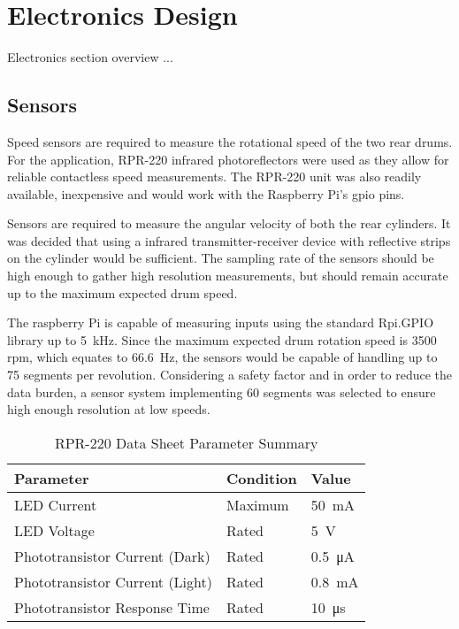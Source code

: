 \newpage

\chapter{Electronics Design}

Electronics section overview ...

\newpage

\section{Sensors}

Speed sensors are required to measure the rotational speed of the two rear drums. For the application, RPR-220 infrared photoreflectors were used as they allow for reliable contactless speed measurements. The RPR-220 unit was also readily available, inexpensive and would work with the Raspberry Pi's \acs{gpio} pins.

Sensors are required to measure the angular velocity of both the rear cylinders. It was decided that using a infrared transmitter-receiver device with reflective strips on the cylinder would be sufficient. The sampling rate of the sensors should be high enough to gather high resolution measurements, but should remain accurate up to the maximum expected drum speed.

The raspberry Pi is capable of measuring inputs using the standard Rpi.GPIO library up to \SI{5}{\kilo\hertz}. Since the maximum expected drum rotation speed is 3500 \acs{rpm}, which equates to \SI{66.6}{\hertz}, the sensors would be capable of handling up to 75 segments per revolution. Considering a safety factor and in order to reduce the data burden, a sensor system implementing 60 segments was selected to ensure high enough resolution at low speeds.

\begin{table}[h!]
	\renewcommand{\arraystretch}{1.5}
	\centering
	\caption{RPR-220 Data Sheet Parameter Summary}
	\citep{RPR:2015}
	\begin{tabularx}{\textwidth}{X >{\raggedright}p{3cm} >{\raggedright\arraybackslash}p{2cm} }
		\toprule
		Parameter                       & Condition & Value                   \\
		\midrule
		LED Current                     & Maximum   & \SI{50}{\milli\ampere}  \\
		LED Voltage                     & Rated     & \SI{5}{\volt}           \\
		Phototransistor Current (Dark)  & Rated     & \SI{0.5}{\micro\ampere} \\
		Phototransistor Current (Light) & Rated     & \SI{0.8}{\milli\ampere} \\
		Phototransistor Response Time   & Rated     & \SI{10}{\micro\second}  \\
		\bottomrule
	\end{tabularx}
	\label{tab:rprdata}
\end{table}

